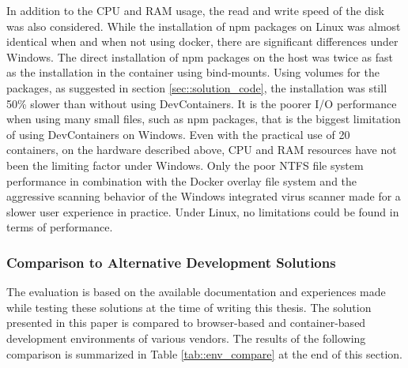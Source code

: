         In addition to the CPU and RAM usage, the read and write speed of the disk was also considered. While the installation of npm packages on Linux was almost identical when and when not using docker, there are significant differences under Windows. The direct installation of npm packages on the host was twice as fast as the installation in the container using bind-mounts. Using volumes for the packages, as suggested in section \ref{sec::solution_code}, the installation was still 50\% slower than without using DevContainers. It is the poorer I/O performance when using many small files, such as npm packages, that is the biggest limitation of using DevContainers on Windows. Even with the practical use of 20 containers, on the hardware described above, CPU and RAM resources have not been the limiting factor under Windows. Only the poor NTFS file system performance in combination with the Docker overlay file system and the aggressive scanning behavior of the Windows integrated virus scanner made for a slower user experience in practice. Under Linux, no limitations could be found in terms of performance.
        

    \subsubsection{Comparison to Alternative Development Solutions}
    The evaluation is based on the available documentation and experiences made while testing these solutions at the time of writing this thesis. The solution presented in this paper is compared to browser-based and container-based development environments of various vendors. The results of the following comparison is summarized in Table \ref{tab::env_compare} at the end of this section.

